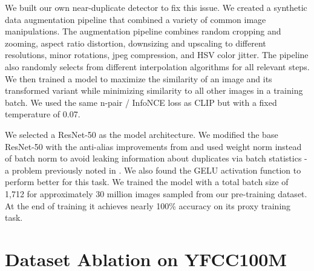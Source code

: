 \documentclass{article}
\begin{document}
We built our own near-duplicate detector to fix this issue. We created a synthetic data augmentation pipeline that combined a variety of common image manipulations. The augmentation pipeline combines random cropping and zooming, aspect ratio distortion, downsizing and upscaling to different resolutions, minor rotations, jpeg compression, and HSV color jitter. The pipeline also randomly selects from different interpolation algorithms for all relevant steps. We then trained a model to maximize the similarity of an image and its transformed variant while minimizing similarity to all other images in a training batch. We used the same n-pair / InfoNCE loss as CLIP but with a fixed temperature of 0.07.

We selected a ResNet-50 as the model architecture. We modified the base ResNet-50 with the anti-alias improvements from \cite{zhang2019making} and used weight norm \cite{salimans2016weight} instead of batch norm \citep{ioffe2015batch} to avoid leaking information about duplicates via batch statistics - a problem previously noted in \cite{henaff2020data}. We also found the GELU activation function \citep{hendrycks2016gaussian} to perform better for this task. We trained the model with a total batch size of 1,712 for approximately 30 million images sampled from our pre-training dataset. At the end of training it achieves nearly 100\% accuracy on its proxy training task.

\section{Dataset Ablation on YFCC100M}
\end{document}
